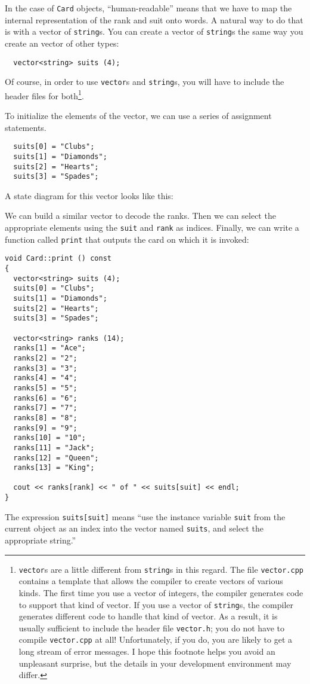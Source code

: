 
In the case of {\tt Card} objects, ``human-readable'' means that we
have to map the internal representation of the rank and suit onto
words.  A natural way to do that is with a vector of {\tt string}s.
You can create a vector of {\tt string}s the same way you create an
vector of other types:

\begin{verbatim}
  vector<string> suits (4);
\end{verbatim}
%
Of course, in order to use {\tt vector}s and {\tt string}s, you
will have to include the header files for both\footnote{{\tt vector}s
are a little different from {\tt string}s in this regard.
The file {\tt vector.cpp} contains a template that allows the
compiler to create vectors of various kinds.  The first time you
use a vector of integers, the compiler generates code
to support that kind of vector.  If you use a vector of {\tt string}s,
the compiler generates different code to handle that kind of
vector.  As a result, it is usually sufficient to include the
header file {\tt vector.h}; you do not have to compile
{\tt vector.cpp} at all!  Unfortunately, if you do, you are
likely to get a long stream of error messages.  I hope this
footnote helps you avoid an unpleasant surprise, but the details
in your development environment may differ.}.

To initialize the elements of the vector, we can use a series of
assignment statements.

\begin{verbatim}
  suits[0] = "Clubs";
  suits[1] = "Diamonds";
  suits[2] = "Hearts";
  suits[3] = "Spades";
\end{verbatim}
%
A state diagram for this vector looks like this:


\vspace{0.1in}
\centerline{}
\vspace{0.1in}

We can build a similar vector to decode the ranks.
Then we can select the appropriate elements
using the {\tt suit} and {\tt rank} as indices.  Finally, we can
write a function called {\tt print} that outputs the card on which
it is invoked:

\begin{verbatim}
void Card::print () const
{
  vector<string> suits (4);
  suits[0] = "Clubs";
  suits[1] = "Diamonds";
  suits[2] = "Hearts";
  suits[3] = "Spades";

  vector<string> ranks (14);
  ranks[1] = "Ace";
  ranks[2] = "2";
  ranks[3] = "3";
  ranks[4] = "4";
  ranks[5] = "5";
  ranks[6] = "6";
  ranks[7] = "7";
  ranks[8] = "8";
  ranks[9] = "9";
  ranks[10] = "10";
  ranks[11] = "Jack";
  ranks[12] = "Queen";
  ranks[13] = "King";

  cout << ranks[rank] << " of " << suits[suit] << endl;
}
\end{verbatim}
%
The expression {\tt suits[suit]} means ``use the instance variable
{\tt suit} from the current object as an index into the vector named
{\tt suits}, and select the appropriate string.''

